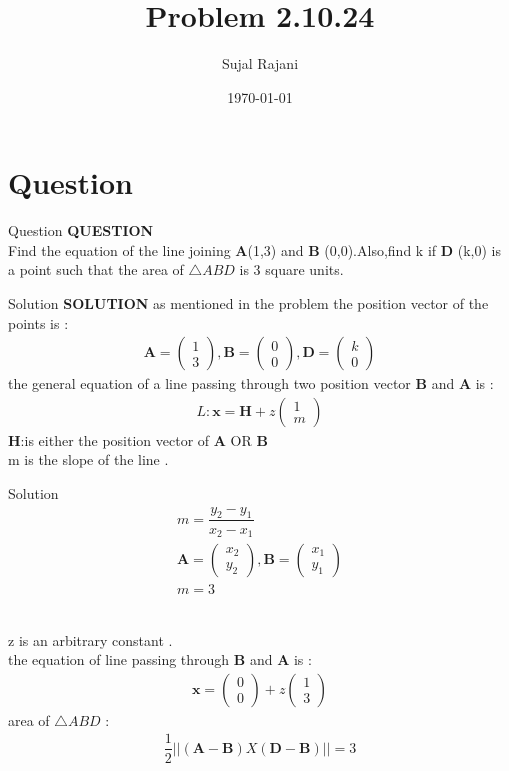 \documentclass{beamer}
\title{Problem 2.10.24}
\author{Sujal Rajani}
\date{\today}
\let\vec\mathbf
\theoremstyle{remark}
\newcommand{\myvec}[1]{\ensuremath{\begin{pmatrix}#1\end{pmatrix}}}
\numberwithin{equation}{section}
\begin{document}
\begin{frame}
\titlepage
\end{frame}

\section{Question}
\begin{frame}{Question}
\textbf{QUESTION}
\\
Find the equation of the line joining $\vec{A}$(1,3) and $\vec{B}$ (0,0).Also,find k if $\vec{D}$ (k,0) is a point such that the area of $\triangle ABD$ is 3 square units.
\end{frame}
\begin{frame}{Solution}
\textbf{SOLUTION}
as mentioned in the problem the position vector of the points is :
\\
\begin{align*}
    \vec{A}=\myvec{1\\3},\vec{B}=\myvec{0\\0},\vec{D}=\myvec{k\\0}
\end{align*}
the general equation of a line passing through two position vector $\vec{B}$ and $\vec{A}$ is :
\begin{align*}
    {L}    : \vec{x}=\vec{H}+z\myvec{1\\m}
\end{align*}
$\vec{H}$:is either the position vector of $\vec{A}$ OR $\vec{B}$
\\
m is the slope of the line .

 \end{frame}
\begin{frame}{Solution}
\begin{align*}
    m=\dfrac{y_2-y_1}{x_2-x_1}
    \\
    \vec{A}=\myvec{x_2\\y_2},\vec{B}=\myvec{x_1\\y_1}
    \\
    m=3
\end{align*}

\\
z is an arbitrary constant .
\\
the equation of line passing through  $\vec{B}$ and $\vec{A}$ is :
\\
\begin{align*}
    \vec{x}=\myvec{0\\0}+z\myvec{1\\3}
\end{align*}
area of $\triangle ABD $ : 
\\
\begin{align*}
    \dfrac{1}{2}||(\vec{A}- \vec{B})X(\vec{D}- \vec{B})||=3
\end{align*}
     \end{frame}
\end{document}
